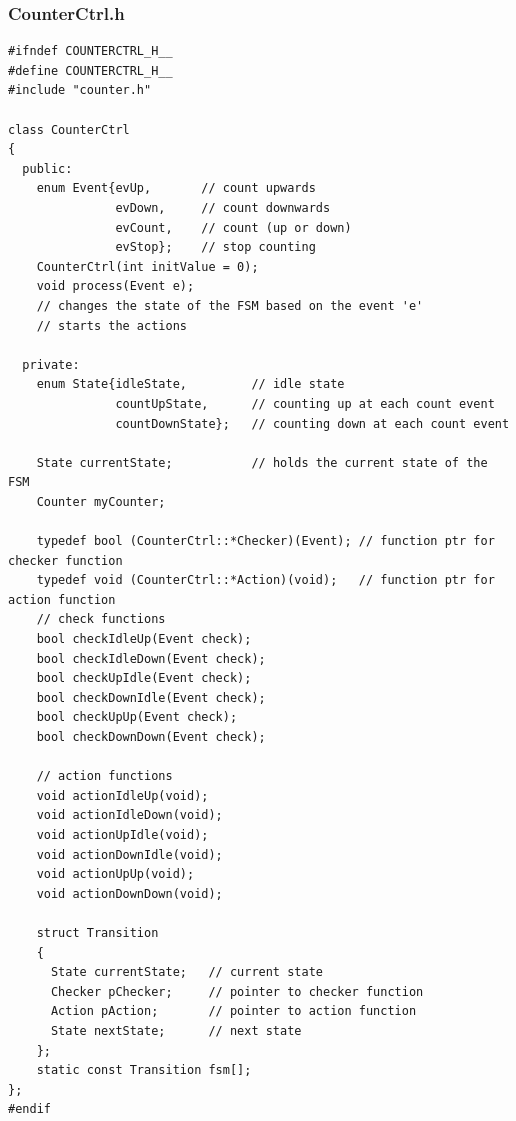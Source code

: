 \subsubsection{CounterCtrl.h}
\begin{lstlisting}[style=Csharp]
#ifndef COUNTERCTRL_H__
#define COUNTERCTRL_H__
#include "counter.h"

class CounterCtrl
{
  public:
    enum Event{evUp,       // count upwards
               evDown,     // count downwards
               evCount,    // count (up or down)
               evStop};    // stop counting
    CounterCtrl(int initValue = 0);
    void process(Event e);
    // changes the state of the FSM based on the event 'e'
    // starts the actions

  private:
    enum State{idleState,         // idle state
               countUpState,      // counting up at each count event
               countDownState};   // counting down at each count event

    State currentState;           // holds the current state of the FSM
    Counter myCounter;
    
    typedef bool (CounterCtrl::*Checker)(Event); // function ptr for checker function
    typedef void (CounterCtrl::*Action)(void);   // function ptr for action function
    // check functions
    bool checkIdleUp(Event check);
    bool checkIdleDown(Event check);
    bool checkUpIdle(Event check);
    bool checkDownIdle(Event check);
    bool checkUpUp(Event check);
    bool checkDownDown(Event check);
    
    // action functions
    void actionIdleUp(void);
    void actionIdleDown(void);
    void actionUpIdle(void);
    void actionDownIdle(void);
    void actionUpUp(void);
    void actionDownDown(void);
    
    struct Transition
    {
      State currentState;   // current state
      Checker pChecker;     // pointer to checker function
      Action pAction;       // pointer to action function
      State nextState;      // next state
    };
    static const Transition fsm[];
};
#endif
\end{lstlisting}

